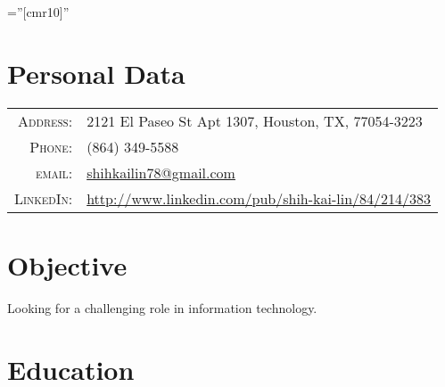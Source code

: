 \documentclass[11pt]{article} %
\begin{document}
\pagestyle{empty} %

\font\fb=''[cmr10]'' %


\par{\bigskip\par} %

\section{Personal Data}

\begin{tabular}{rl}
\textsc{Address:} & 2121 El Paseo St Apt 1307, Houston, TX, 77054-3223 \\
\textsc{Phone:} & (864) 349-5588 \\
\textsc{email:} & \href{mailto:shihkailin78@gmail.com}{shihkailin78@gmail.com} \\
\textsc{LinkedIn:} & \href{http://www.linkedin.com/pub/shih-kai-lin/84/214/383}{http://www.linkedin.com/pub/shih-kai-lin/84/214/383}
\end{tabular}


\section{Objective}
Looking for a challenging role in information technology.


\section{Education}
\end{document}
